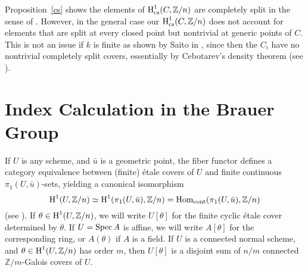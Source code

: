 \documentclass{amsart}
\theoremstyle{plain}
\theoremstyle{definition}
\theoremstyle{remark}
\numberwithin{equation}{section}%
\renewcommand{\H}{{\text{\rm H}}}
\renewcommand{\O}{{\text{\rm O}}}
\renewcommand{\S}{{\mathcal S}}
\newcommand{\Z}{{\mathbb Z}}
\newcommand{\cont}{{\text{\rm cont}}}
\newcommand{\cs}{{\text{\rm cs}}}
\newcommand{\isim}{{\;\overset{\sim}{\longrightarrow}\;}}
\newcommand{\isom}{{\;\simeq\;}}
\newcommand{\Hom}{{\text{\rm Hom}}}
\newcommand{\Spec}{{\text{\rm Spec}\,}}
\begin{document}
\Remark\label{remark}
Proposition~\ref{cs} shows the elements of $\H^1_\cs(C,\Z/n)$ are completely split in the sense of \cite{Sai85}.
However, in the general case our $\H^1_\cs(C,\Z/n)$ does not account for elements 
that are split at every closed point but nontrivial at generic points
of $C$.  This is not an issue if $k$ is finite as shown by Saito in \cite[Theorem 2.4]{Sai85},
since then the $C_i$ have no nontrivial completely split covers, essentially
by Cebotarev's density theorem (see \cite[Lemma 1.7]{Ras}).






\section{Index Calculation in the Brauer Group}

If $U$ is any scheme, and $\bar u$ is a geometric point,
the fiber functor defines a category equivalence between (finite) \'etale covers of $U$ 
and finite continuous $\pi_1(U,\bar u)$-sets, yielding a canonical isomorphism
$$
\H^1(U,\Z/n)\isom\H^1(\pi_1(U,\bar u),\Z/n)=\Hom_\cont(\pi_1(U,\bar u),\Z/n)
$$
(see \cite[I.2.11]{FK}).
If $\theta\in\H^1(U,\Z/n)$, we will write $U[\theta]$ for the finite cyclic \'etale 
cover determined by $\theta$.  If $U=\Spec A$ is affine, we will write $A[\theta]$
for the corresponding ring, or $A(\theta)$ if $A$ is a field.
If $U$ is a connected normal scheme, and $\theta\in\H^1(U,\Z/n)$ has order $m$, 
then $U[\theta]$ is a disjoint sum of $n/m$ connected $\Z/m$-Galois covers of $U$.
\end{document}
